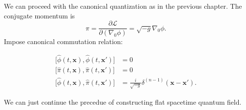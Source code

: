 \documentclass[12pt]{article}
\numberwithin{equation}{subsection}
\theoremstyle{mystyle}{\newtheorem{definition}{Definition}[subsection]}
\theoremstyle{mystyle}{\newtheorem{theorem}[definition]{Theorem}}
\theoremstyle{mystyle}{\newtheorem*{remark}{Remark}}
\theoremstyle{mystyle}{\newtheorem{example}{Example}[subsection]}
\theoremstyle{mystyle}{\newtheorem{examples}{Examples}[subsection]}
\theoremstyle{mystyle}{\newtheorem{cthm}{}[subsection]}
\newcommand{\p}{\partial}
\begin{document}
We can proceed with the canonical quantization as in the previous chapter.
The conjugate momentum is
\begin{equation}
  \pi=\frac{\p \mathcal{L}}{\p(\nabla_{0}\phi)}=\sqrt{-g}\nabla_{0}\phi.
\end{equation}
Impose canonical commutation relation:
\begin{cthm}\label{cccr}
  \begin{align*}
    \bigl[\hat{\phi}(t,\mathbf{x}),\hat{\phi}(t,\mathbf{x'})\bigr] & =0                                                          \\
    \bigl[\hat{\pi}(t,\mathbf{x}),\hat{\pi}(t,\mathbf{x'})\bigr]   & =0                                                          \\
    \bigl[\hat{\phi}(t,\mathbf{x}),\hat{\pi}(t,\mathbf{x'})\bigr]  & =\frac{i}{\sqrt{-g}}\delta^{(n-1)}(\mathbf{x}-\mathbf{x'}).
  \end{align*}
\end{cthm}
We can just continue the precedue of constructing flat spacetime quantum field.
\end{document}
